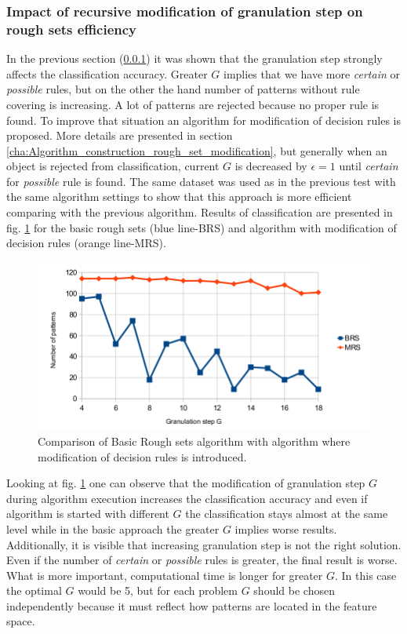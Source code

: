 \subsubsection{Impact of recursive modification of granulation step on rough sets
efficiency}
\label{cha:Simulation_reaearch_2}
In the previous section (\ref{cha:Simulation_reaearch_2}) it was shown that the
granulation step strongly affects the classification accuracy.
Greater $G$ implies that we have more \textit{certain} or \textit{possible}
rules, but on the other the hand number of patterns without rule covering is 
increasing. A lot of patterns are rejected because no proper rule is found. To improve that
situation an algorithm for modification of decision rules is proposed. More
details are presented in section \ref{cha:Algorithm_construction_rough_set_modification}, but generally when an
object is rejected from classification, current $G$ is decreased by $\epsilon=1$ until 
\textit{certain} for \textit{possible} rule is found. The same dataset was used as in
the previous test with the same algorithm settings to show that this approach
is more efficient comparing with the previous algorithm. Results of classification
are presented in fig. \ref{fig:Simulation_research_2} for the basic rough
sets (blue line-BRS) and algorithm with modification of decision rules (orange
line-MRS).
\begin{figure}[H]
    \begin{center}
        \includegraphics[width=\textwidth]{fig/rough_chart.png}
    \end{center}
    \caption{Comparison of Basic Rough sets algorithm with algorithm where
    modification of decision rules is introduced.}
    \label{fig:Simulation_research_2}
\end{figure}

Looking at fig. \ref{fig:Simulation_research_2} one can observe that
the modification of granulation step $G$ during algorithm execution increases 
the classification accuracy and even if algorithm is started with different $G$
the classification stays almost at the same level while in the basic approach the 
greater $G$ implies worse results. Additionally, it is visible that increasing granulation 
step is not the right solution. Even if the number of \textit{certain} or
\textit{possible} rules is greater, the final result is worse. What is more
important, computational time is longer for greater $G$. In this case the optimal 
$G$ would be 5, but for each problem $G$ should be chosen independently because 
it must reflect how patterns are located in the feature space.

